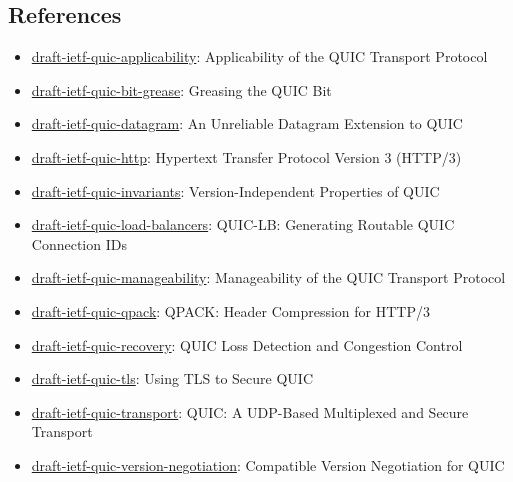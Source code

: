 \documentclass[documentation]{subfiles}
\begin{document}
\subsection{References}
\begin{itemize}
    \item \href{https://tools.ietf.org/html/draft-ietf-quic-applicability}{draft-ietf-quic-applicability}: Applicability of the QUIC Transport Protocol
    \item \href{https://tools.ietf.org/html/draft-ietf-quic-bit-grease}{draft-ietf-quic-bit-grease}: Greasing the QUIC Bit
    \item \href{https://tools.ietf.org/html/draft-ietf-quic-datagram}{draft-ietf-quic-datagram}: An Unreliable Datagram Extension to QUIC
    \item \href{https://tools.ietf.org/html/draft-ietf-quic-http}{draft-ietf-quic-http}: Hypertext Transfer Protocol Version 3 (HTTP/3)
    \item \href{https://tools.ietf.org/html/draft-ietf-quic-invariants}{draft-ietf-quic-invariants}: Version-Independent Properties of QUIC
    \item \href{https://tools.ietf.org/html/draft-ietf-quic-load-balancers}{draft-ietf-quic-load-balancers}: QUIC-LB: Generating Routable QUIC Connection IDs
    \item \href{https://tools.ietf.org/html/draft-ietf-quic-manageability}{draft-ietf-quic-manageability}: Manageability of the QUIC Transport Protocol
    \item \href{https://tools.ietf.org/html/draft-ietf-quic-qpack}{draft-ietf-quic-qpack}: QPACK: Header Compression for HTTP/3
    \item \href{https://tools.ietf.org/html/draft-ietf-quic-recovery}{draft-ietf-quic-recovery}: QUIC Loss Detection and Congestion Control
    \item \href{https://tools.ietf.org/html/draft-ietf-quic-tls}{draft-ietf-quic-tls}: Using TLS to Secure QUIC
    \item \href{https://tools.ietf.org/html/draft-ietf-quic-transport}{draft-ietf-quic-transport}: QUIC: A UDP-Based Multiplexed and Secure Transport
    \item \href{https://tools.ietf.org/html/draft-ietf-quic-version-negotiation}{draft-ietf-quic-version-negotiation}: Compatible Version Negotiation for QUIC
\end{itemize}
\end{document}
